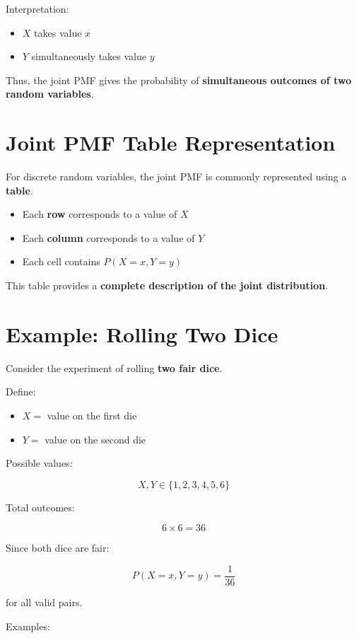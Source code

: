\documentclass[12pt]{article}
\begin{document}
Interpretation:

\begin{itemize}
\item $X$ takes value $x$
\item $Y$ simultaneously takes value $y$
\end{itemize}

Thus, the joint PMF gives the probability of \textbf{simultaneous outcomes of two random variables}.

\section{Joint PMF Table Representation}

For discrete random variables, the joint PMF is commonly represented using a \textbf{table}.

\begin{itemize}
\item Each \textbf{row} corresponds to a value of $X$
\item Each \textbf{column} corresponds to a value of $Y$
\item Each cell contains $P(X=x,Y=y)$
\end{itemize}

This table provides a \textbf{complete description of the joint distribution}.

\section{Example: Rolling Two Dice}

Consider the experiment of rolling \textbf{two fair dice}.

Define:

\begin{itemize}
\item $X =$ value on the first die
\item $Y =$ value on the second die
\end{itemize}

Possible values:

\[
X,Y \in \{1,2,3,4,5,6\}
\]

Total outcomes:

\[
6 \times 6 = 36
\]

Since both dice are fair:

\[
P(X=x,Y=y)=\frac{1}{36}
\]

for all valid pairs.

Examples:
\end{document}
